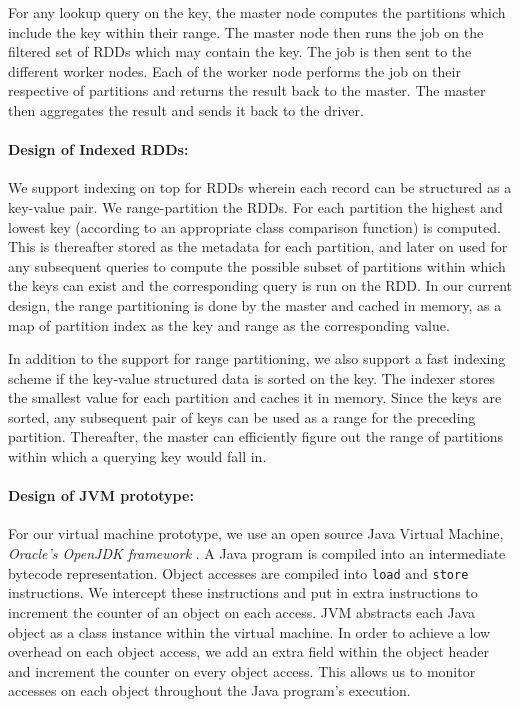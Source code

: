 For any lookup query on the key, the master node computes the partitions
which include the key within their range. The master node then runs the
job on the filtered set of RDDs which may contain the key. The job is
then sent to the different worker nodes. Each of the worker node
performs the job on their respective of partitions and returns the
result back to the master. The master then aggregates the result and
sends it back to the driver. 

\paragraph{Design of Indexed RDDs:}
We support indexing on top for RDDs wherein each record can be
structured as a key-value pair.  We range-partition the RDDs. For each
partition the highest and lowest key (according to an appropriate class
comparison function) is computed.  This is thereafter stored as the
metadata for each partition, and later on used for any subsequent
queries to compute the possible subset of partitions within which the
keys can exist and the corresponding query is run on the RDD. In our
current design, the range partitioning is done by the master and cached
in memory, as a map of partition index as the
key and range as the corresponding value.

In addition to the support for range partitioning, we also support a
fast indexing scheme if the key-value structured data is sorted on the
key. The indexer stores the smallest value for each partition and caches
it in memory. Since the keys are sorted, any subsequent pair of keys can
be used as a range for the preceding partition. Thereafter, the master
can efficiently figure out the range of partitions within which a
querying key would fall in. 

\paragraph{Design of JVM prototype:}
For our virtual machine prototype, we use an open source Java Virtual
Machine, \emph{Oracle's OpenJDK framework} \cite{openjdk}. A Java
program is compiled into an intermediate bytecode representation. Object
accesses are compiled into \texttt{load} and \texttt{store}
instructions. We intercept these instructions and put in extra
instructions to increment the counter of an object on each access.  JVM
abstracts each Java object as a class instance within the virtual
machine.  In order to achieve a low overhead on each object access, we
add an extra field within the object header and increment the counter on
every object access. This allows us to monitor accesses on each object
throughout the Java program's execution.

